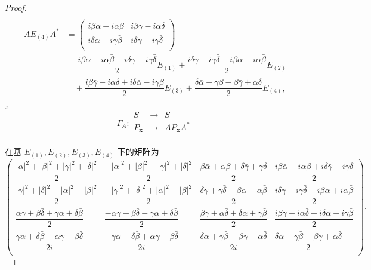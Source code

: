\documentclass{ctexart}
\begin{document}
\begin{proof}
\begin{align*}
    \end{align*}
    \begin{align*}
        AE_{(4)}A^* & =\begin{pmatrix}
            i\beta\bar{\alpha}-i\alpha\bar{\beta} & i\beta\bar{\gamma}-i\alpha\bar{\delta} \\
            i\delta\bar{\alpha}-i\gamma\bar{\beta} & i\delta\bar{\gamma}-i\gamma\bar{\delta} \\
        \end{pmatrix} \\
        & =\dfrac{i\beta\bar{\alpha}-i\alpha\bar{\beta}+i\delta\bar{\gamma}-i\gamma\bar{\delta}}{2}E_{(1)}+\dfrac{i\delta\bar{\gamma}-i\gamma\bar{\delta}-i\beta\bar{\alpha}+i\alpha\bar{\beta}}{2}E_{(2)} \\
        & \quad+\dfrac{i\beta\bar{\gamma}-i\alpha\bar{\delta}+i\delta\bar{\alpha}-i\gamma\bar{\beta}}{2}E_{(3)}+\dfrac{\delta\bar{\alpha}-\gamma\bar{\beta}-\beta\bar{\gamma}+\alpha\bar{\delta}}{2}E_{(4)},
    \end{align*}

    $\therefore$
    \[\Gamma_A:\begin{array}{rcl}
        S & \to & S \\
        P_{\boldsymbol{x}} & \to & AP_{\boldsymbol{x}}A^* \\
    \end{array}\]

    在基 $E_{(1)},E_{(2)},E_{(3)},E_{(4)}$ 下的矩阵为
    \[\begin{pmatrix}
        \dfrac{|\alpha|^2+|\beta|^2+|\gamma|^2+|\delta|^2}{2} & \dfrac{-|\alpha|^2+|\beta|^2-|\gamma|^2+|\delta|^2}{2} & \dfrac{\beta\bar{\alpha}+\alpha\bar{\beta}+\delta\bar{\gamma}+\gamma\bar{\delta}}{2} & \dfrac{i\beta\bar{\alpha}-i\alpha\bar{\beta}+i\delta\bar{\gamma}-i\gamma\bar{\delta}}{2} \\[8pt]
        \dfrac{|\gamma|^2+|\delta|^2-|\alpha|^2-|\beta|^2}{2} & \dfrac{-|\gamma|^2+|\delta|^2+|\alpha|^2-|\beta|^2}{2} & \dfrac{\delta\bar{\gamma}+\gamma\bar{\delta}-\beta\bar{\alpha}-\alpha\bar{\beta}}{2} & \dfrac{i\delta\bar{\gamma}-i\gamma\bar{\delta}-i\beta\bar{\alpha}+i\alpha\bar{\beta}}{2} \\[8pt]
        \dfrac{\alpha\bar{\gamma}+\beta\bar{\delta}+\gamma\bar{\alpha}+\delta\bar{\beta}}{2} & \dfrac{-\alpha\bar{\gamma}+\beta\bar{\delta}-\gamma\bar{\alpha}+\delta\bar{\beta}}{2} & \dfrac{\beta\bar{\gamma}+\alpha\bar{\delta}+\delta\bar{\alpha}+\gamma\bar{\beta}}{2} & \dfrac{i\beta\bar{\gamma}-i\alpha\bar{\delta}+i\delta\bar{\alpha}-i\gamma\bar{\beta}}{2} \\[8pt]
        \dfrac{\gamma\bar{\alpha}+\delta\bar{\beta}-\alpha\bar{\gamma}-\beta\bar{\delta}}{2i} & \dfrac{-\gamma\bar{\alpha}+\delta\bar{\beta}+\alpha\bar{\gamma}-\beta\bar{\delta}}{2i} & \dfrac{\delta\bar{\alpha}+\gamma\bar{\beta}-\beta\bar{\gamma}-\alpha\bar{\delta}}{2i} & \dfrac{\delta\bar{\alpha}-\gamma\bar{\beta}-\beta\bar{\gamma}+\alpha\bar{\delta}}{2} \\[8pt]
    \end{pmatrix}.\]


\end{proof}
\end{document}
